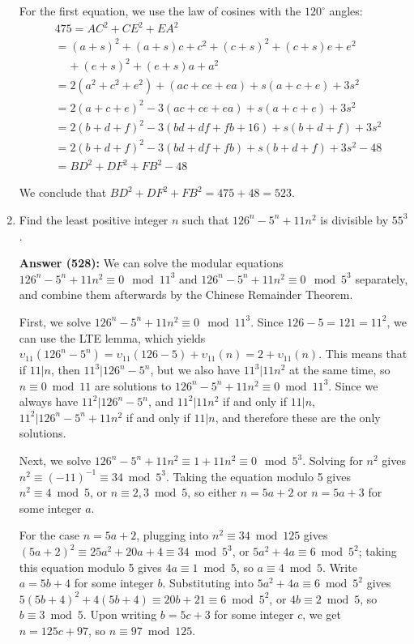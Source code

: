\documentclass{article}
\begin{document}
\begin{enumerate}
For the first equation, we use the law of cosines with the $120^{\circ}$ angles: \begin{align*}
    &475 = AC^2+CE^2+EA^2 \\
    &= (a+s)^2+(a+s)c+c^2+(c+s)^2+(c+s)e+e^2 \\ 
    &\; \; \; \; +(e+s)^2+(e+s)a+a^2 \\
    &= 2(a^2+c^2+e^2)+(ac+ce+ea)+s(a+c+e)+3s^2\\
    &= 2(a+c+e)^2-3(ac+ce+ea)+s(a+c+e)+3s^2 \\
    &= 2(b+d+f)^2-3(bd+df+fb+16)+s(b+d+f)+3s^2 \\
    &= 2(b+d+f)^2-3(bd+df+fb)+s(b+d+f)+3s^2-48 \\
    &= BD^2+DF^2+FB^2-48
\end{align*}

We conclude that $BD^2+DF^2+FB^2 = 475+48 = \boxed{523}$.


\newpage

\item Find the least positive integer $n$ such that $126^n-5^n+11n^2$ is divisible by $55^3$.

\textbf{Answer (528):} We can solve the modular equations $126^n-5^n+11n^2 \equiv 0 \mod 11^3$ and $126^n-5^n+11n^2 \equiv 0 \mod 5^3$ separately, and combine them afterwards by the Chinese Remainder Theorem.

First, we solve $126^n-5^n+11n^2 \equiv 0 \mod 11^3$. Since $126-5=121=11^2$, we can use the LTE lemma, which yields $\upsilon_{11}(126^n-5^n)=\upsilon_{11}(126-5)+\upsilon_{11}(n)=2+\upsilon_{11}(n)$. This means that if $11 | n$, then $11^3 | 126^n-5^n$, but we also have $11^3 | 11n^2$ at the same time, so $n \equiv 0 \bmod 11$ are solutions to $126^n-5^n+11n^2 \equiv 0 \bmod 11^3$. Since we always have $11^2 | 126^n-5^n$, and $11^2 | 11n^2$ if and only if $11 | n$, $11^2 | 126^n-5^n+11n^2$ if and only if $11 | n$, and therefore these are the only solutions.

Next, we solve $126^n-5^n+11n^2 \equiv 1+11n^2 \equiv 0 \mod 5^3$. Solving for $n^2$ gives $n^2 \equiv (-11)^{-1} \equiv 34 \bmod 5^3$. Taking the equation modulo 5 gives $n^2 \equiv 4 \bmod 5$, or $n \equiv 2,3 \bmod 5$, so either $n = 5a+2$ or $n = 5a+3$ for some integer $a$. 

For the case $n = 5a+2$, plugging into $n^2 \equiv 34 \bmod 125$ gives $(5a+2)^2 \equiv 25a^2+20a+4 \equiv 34 \bmod 5^3$, or $5a^2+4a \equiv 6 \bmod 5^2$; taking this equation modulo 5 gives $4a \equiv 1 \bmod 5$, so $a \equiv 4 \bmod 5$. Write $a = 5b+4$ for some integer $b$. Substituting into $5a^2+4a \equiv 6 \bmod 5^2$ gives $5(5b+4)^2+4(5b+4) \equiv 20b+21 \equiv 6 \bmod 5^2$, or $4b \equiv 2 \bmod 5$, so $b \equiv 3 \bmod 5$. Upon writing $b = 5c+3$ for some integer $c$, we get $n = 125c+97$, so $n \equiv 97 \bmod 125$.


\end{enumerate}
\end{document}
